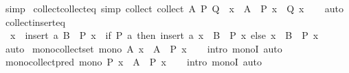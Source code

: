 \begin{isabellebody}
\ simp%
\endisatagproof
{\isafoldproof}%
%
\isadelimproof
\isanewline
%
\endisadelimproof
\isanewline
{}\isamarkupfalse%
\ collect{\isacharunderscore}{\kern0pt}collect{\isacharunderscore}{\kern0pt}eq\ {\isacharbrackleft}{\kern0pt}simp{\isacharbrackright}{\kern0pt}{\isacharcolon}{\kern0pt}\ {\isachardoublequoteopen}collect\ {\isacharparenleft}{\kern0pt}collect\ A\ P{\isacharparenright}{\kern0pt}\ Q\ {\isacharequal}{\kern0pt}\ {\isacharbraceleft}{\kern0pt}x\ {\isasymin}\ A\ {\isacharbar}{\kern0pt}\ P\ x\ {\isasymand}\ Q\ x{\isacharbraceright}{\kern0pt}{\isachardoublequoteclose}\isanewline
%
\isadelimproof
\ \ %
\endisadelimproof
%
\isatagproof
{}\isamarkupfalse%
\ auto%
\endisatagproof
{\isafoldproof}%
%
\isadelimproof
\isanewline
%
\endisadelimproof
\isanewline
{}\isamarkupfalse%
\ collect{\isacharunderscore}{\kern0pt}insert{\isacharunderscore}{\kern0pt}eq{\isacharcolon}{\kern0pt}\isanewline
\ \ {\isachardoublequoteopen}{\isacharbraceleft}{\kern0pt}x\ {\isasymin}\ insert\ a\ B\ {\isacharbar}{\kern0pt}\ P\ x{\isacharbraceright}{\kern0pt}\ {\isacharequal}{\kern0pt}\ {\isacharparenleft}{\kern0pt}if\ P\ a\ then\ insert\ a\ {\isacharbraceleft}{\kern0pt}x\ {\isasymin}\ B\ {\isacharbar}{\kern0pt}\ P\ x{\isacharbraceright}{\kern0pt}\ else\ {\isacharbraceleft}{\kern0pt}x\ {\isasymin}\ B\ {\isacharbar}{\kern0pt}\ P\ x{\isacharbraceright}{\kern0pt}{\isacharparenright}{\kern0pt}{\isachardoublequoteclose}\isanewline
%
\isadelimproof
\ \ %
\endisadelimproof
%
\isatagproof
{}\isamarkupfalse%
\ auto%
\endisatagproof
{\isafoldproof}%
%
\isadelimproof
\isanewline
%
\endisadelimproof
\isanewline
{}\isamarkupfalse%
\ mono{\isacharunderscore}{\kern0pt}collect{\isacharunderscore}{\kern0pt}set{\isacharcolon}{\kern0pt}\ {\isachardoublequoteopen}mono\ {\isacharparenleft}{\kern0pt}{\isasymlambda}A{\isachardot}{\kern0pt}\ {\isacharbraceleft}{\kern0pt}x\ {\isasymin}\ A\ {\isacharbar}{\kern0pt}\ P\ x{\isacharbraceright}{\kern0pt}{\isacharparenright}{\kern0pt}{\isachardoublequoteclose}\isanewline
%
\isadelimproof
\ \ %
\endisadelimproof
%
\isatagproof
{}\isamarkupfalse%
\ {\isacharparenleft}{\kern0pt}intro\ monoI{\isacharparenright}{\kern0pt}\ auto%
\endisatagproof
{\isafoldproof}%
%
\isadelimproof
\isanewline
%
\endisadelimproof
\isanewline
{}\isamarkupfalse%
\ mono{\isacharunderscore}{\kern0pt}collect{\isacharunderscore}{\kern0pt}pred{\isacharcolon}{\kern0pt}\ {\isachardoublequoteopen}mono\ {\isacharparenleft}{\kern0pt}{\isasymlambda}P{\isachardot}{\kern0pt}\ {\isacharbraceleft}{\kern0pt}x\ {\isasymin}\ A\ {\isacharbar}{\kern0pt}\ P\ x{\isacharbraceright}{\kern0pt}{\isacharparenright}{\kern0pt}{\isachardoublequoteclose}\isanewline
%
\isadelimproof
\ \ %
\endisadelimproof
%
\isatagproof
{}\isamarkupfalse%
\ {\isacharparenleft}{\kern0pt}intro\ monoI{\isacharparenright}{\kern0pt}\ auto%
\endisatagproof
{\isafoldproof}%
%
\isadelimproof
\isanewline
%
\endisadelimproof
\isanewline
%
\isadelimtheory
\isanewline
%
\endisadelimtheory
%
\isatagtheory
{}\isamarkupfalse%
%
\endisatagtheory
{\isafoldtheory}%
%
\isadelimtheory
%
\endisadelimtheory
%
\end{isabellebody}%
